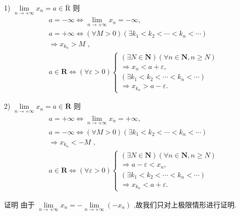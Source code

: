 1) $\mathop{\lim }\limits_{{n \rightarrow   + \infty }}{x}_{n} = a \in  \overline{\mathrm{R}}$ 则
\begin{align*}
	&a =  - \infty  \Leftrightarrow  \mathop{\lim }\limits_{{n \rightarrow   + \infty }}{x}_{n} =  - \infty ,\\
	&a =  + \infty  \Leftrightarrow  \left( {\forall M > 0}\right) \left( {\exists {k}_{1} < {k}_{2} < \cdots  < {k}_{n} < \cdots }\right)\\
	&\Rightarrow  {x}_{{k}_{n}} > M\text{ , }\\
	&a \in  \mathbf{R} \Leftrightarrow  \left( {\forall \varepsilon  > 0}\right) \left\{  \begin{array}{l} \left( {\exists N \in  \mathbf{N}}\right) \left( {\forall n \in  \mathbf{N},n \geq  N}\right) \\   \Rightarrow  {x}_{n} < a + \varepsilon , \\  \left( {\exists {k}_{1} < {k}_{2} < \cdots  < {k}_{n} < \cdots }\right) \\   \Rightarrow  {x}_{{k}_{n}} > a - \varepsilon . \end{array}\right.
\end{align*}

2) $\mathop{\lim }\limits_{{n \rightarrow   + \infty }}{x}_{n} = a \in  \overline{\mathbf{R}}$ 则
\begin{align*}
	&a =  + \infty  \Leftrightarrow  \mathop{\lim }\limits_{{n \rightarrow   + \infty }}{x}_{n} =  + \infty ,\\
	&a =  - \infty  \Leftrightarrow  \left( {\forall M > 0}\right) \left( {\exists {k}_{1} < {k}_{2} < \cdots  < {k}_{n} < \cdots }\right)\\
	&\Rightarrow  {x}_{{k}_{n}} <  - M\text{ , }\\
	&a \in  \mathbf{R} \Leftrightarrow  \left( {\forall \varepsilon  > 0}\right) \left\{  \begin{array}{l} \left( {\exists N \in  \mathbf{N}}\right) \left( {\forall n \in  \mathbf{N},n \geq  N}\right) \\   \Rightarrow  a - \varepsilon  < {x}_{n}, \\  \left( {\exists {k}_{1} < {k}_{2} < \cdots  < {k}_{n} < \cdots }\right) \\   \Rightarrow  {x}_{{k}_{n}} < a + \varepsilon . \end{array}\right.
\end{align*}

证明 由于 $\mathop{\lim }\limits_{{n \rightarrow   + \infty }}{x}_{n} =  - \mathop{\lim }\limits_{{n \rightarrow   + \infty }}\left( {-{x}_{n}}\right)$ ,故我们只对上极限情形进行证明.

